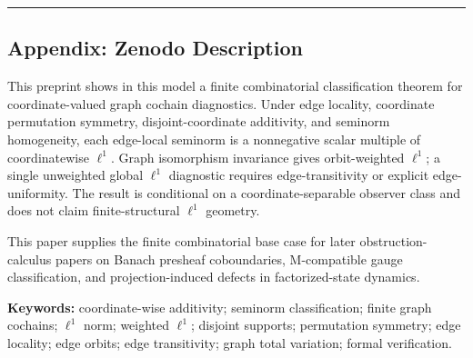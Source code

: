 \documentclass[
  11pt,
]{article}
\begin{document}
\begin{center}\rule{0.5\linewidth}{0.5pt}\end{center}

\hypertarget{appendix-zenodo-description}{%
\subsection{Appendix: Zenodo
Description}\label{appendix-zenodo-description}}

This preprint shows in this model a finite combinatorial classification
theorem for coordinate-valued graph cochain diagnostics. Under edge
locality, coordinate permutation symmetry, disjoint-coordinate
additivity, and seminorm homogeneity, each edge-local seminorm is a
nonnegative scalar multiple of coordinatewise \(\ell^1\). Graph
isomorphism invariance gives orbit-weighted \(\ell^1\); a single
unweighted global \(\ell^1\) diagnostic requires edge-transitivity or
explicit edge-uniformity. The result is conditional on a
coordinate-separable observer class and does not claim finite-structural
\(\ell^1\) geometry.

This paper supplies the finite combinatorial base case for later
obstruction-calculus papers on Banach presheaf coboundaries,
M-compatible gauge classification, and projection-induced defects in
factorized-state dynamics.

\textbf{Keywords:} coordinate-wise additivity; seminorm classification;
finite graph cochains; \(\ell^1\) norm; weighted \(\ell^1\); disjoint
supports; permutation symmetry; edge locality; edge orbits; edge
transitivity; graph total variation; formal verification.
\end{document}
